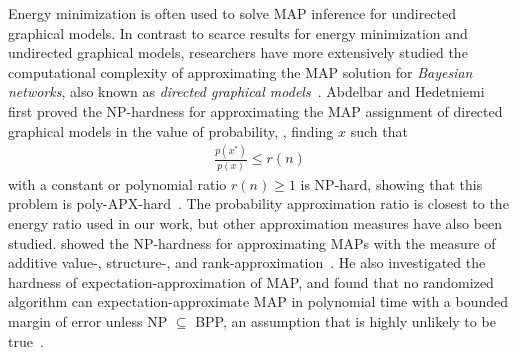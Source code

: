 Energy minimization is often used to solve MAP inference for undirected graphical models. In contrast to scarce results for energy minimization and undirected graphical models, researchers have more extensively studied the computational complexity of approximating the MAP solution for {\em Bayesian networks}, also known as {\em directed graphical models}~\cite{kwisthout2015tree}. Abdelbar and Hedetniemi first proved the NP-hardness for approximating the MAP assignment of directed graphical models in the value of probability, \ie, finding $x$ such that
\begin{align}\label{p-approx-ratio}
\frac{p(x^*)}{p(x)} \leq r(n)
\end{align}
with a constant or polynomial ratio $r(n) \geq 1$ is NP-hard, showing that this problem is poly-APX-hard~\cite{Abdelbar-98}. 
The probability approximation ratio is closest to the energy ratio used in our work, but other approximation measures have also been studied.  \citeauthor{Kwisthout-11} showed the NP-hardness for approximating MAPs with the measure of additive value-, structure-, and rank-approximation~\cite{Kwisthout-11,Kwisthout-13,kwisthout2015tree}.
He also investigated the hardness of expectation-approximation of MAP, and found that no randomized algorithm can expectation-approximate MAP in polynomial time with a bounded margin of error unless NP $\subseteq$ BPP, an assumption that is highly unlikely to be true~\cite{kwisthout2015tree}.

